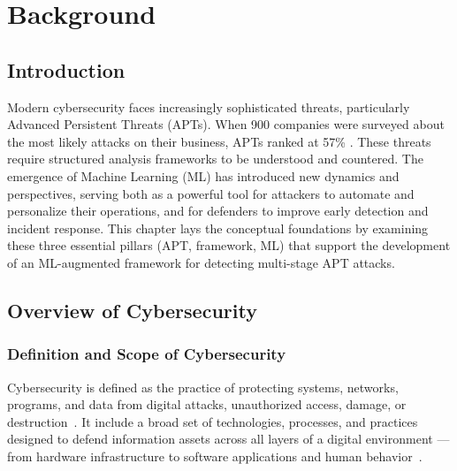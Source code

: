 \chapter{Background}
\label{chap:background}

\section{Introduction}
Modern cybersecurity faces increasingly sophisticated threats, particularly Advanced Persistent Threats (APTs). When 900 companies were surveyed about the most likely attacks on their business, APTs ranked at 57\% \cite{aag2024stats}. These threats require structured analysis frameworks to be understood and countered. The emergence of Machine Learning (ML) has introduced new dynamics and perspectives, serving both as a powerful tool for attackers to automate and personalize their operations, and for defenders to improve early detection and incident response. This chapter lays the conceptual foundations by examining these three essential pillars (APT, framework, ML) that support the development of an ML-augmented framework for detecting multi-stage APT attacks.

\section{Overview of Cybersecurity}

\subsection{Definition and Scope of Cybersecurity}
Cybersecurity is defined as the practice of protecting systems, networks, programs, and data from digital attacks, unauthorized access, damage, or destruction~\cite{cains2022cybersecurity,nist2023cyber}. It include a broad set of technologies, processes, and practices designed to defend information assets across all layers of a digital environment --- from hardware infrastructure to software applications and human behavior~\cite{cisco2024cyber}.

